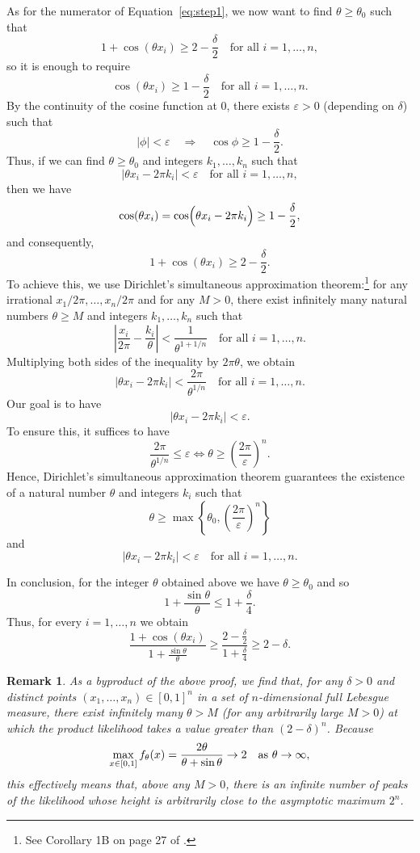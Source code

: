 \documentclass[11pt,twoside]{article}
\newtheorem{remark}{Remark}
\begin{document}
As for the numerator of Equation~\eqref{eq:step1}, we now want to find $\theta\geq \theta_0$ such that
\[
1+\cos(\theta x_i) \ge 2-\frac{\delta}{2} \quad \text{for all } i=1,\dots,n,
\]
so it is enough to require
\[
\cos(\theta x_i) \ge 1-\frac{\delta}{2} \quad \text{for all } i=1,\dots,n.
\]
By the continuity of the cosine function at \(0\), there exists \(\varepsilon > 0\) (depending on \(\delta\)) such that
\[
|\phi| < \varepsilon \quad \Longrightarrow \quad \cos \phi \ge 1-\frac{\delta}{2}.
\]
Thus, if we can find $\theta\geq\theta_0$ and integers $k_1,\dots,k_n$ such that
\[
|\theta x_i - 2\pi k_i| < \varepsilon \quad \text{for all } i=1,\dots,n,
\]
then we have
\[
\cos(\theta x_i) = \cos\Bigl(\theta x_i - 2\pi k_i\Bigr) \ge 1-\frac{\delta}{2},
\]
and consequently,
\[
1+\cos(\theta x_i) \ge 2-\frac{\delta}{2}.
\]
%
To achieve this, we use Dirichlet's simultaneous approximation theorem:\footnote{See Corollary 1B on page 27 of \cite{schmidt2009diophantine}.} for any irrational \(x_1/2\pi, \dots, x_n/2\pi\) and for any \(M > 0\), there exist infinitely many natural numbers \(\theta \ge M\) and integers \(k_1, \dots, k_n\) such that
\[
\left|\frac{x_i}{2\pi} - \frac{k_i}{\theta}\right| < \frac{1}{\theta^{1+1/n}} \quad \text{for all } i = 1,\dots, n.
\]
Multiplying both sides of the inequality by \(2\pi \theta\), we obtain
\[
|\theta x_i - 2\pi k_i| < \frac{2\pi}{\theta^{1/n}} \quad \text{for all } i=1,\dots,n.
\]
Our goal is to have
\[
|\theta x_i - 2\pi k_i| < \varepsilon.
\]
To ensure this, it suffices to have
\[
\frac{2\pi}{\theta^{1/n}} \le \varepsilon \iff \theta \ge \left(\frac{2\pi}{\varepsilon}\right)^n.
\]
%
Hence, Dirichlet's simultaneous approximation theorem guarantees the existence of a natural number \(\theta\) and integers \(k_i\) such that
%
\[
\theta \ge \max\left\{\theta_0, \left(\frac{2\pi}{\varepsilon}\right)^n\right\}
\]
%
and
%
\begin{equation*}
     |\theta x_i - 2\pi k_i| < \varepsilon \quad \text{for all } i=1,\dots,n.
\end{equation*}

In conclusion, for the integer \(\theta\) obtained above we have \(\theta \ge \theta_0\) and so
\[
1+\frac{\sin\theta}{\theta} \le 1+\frac{\delta}{4}.
\]
Thus, for every \(i=1,\dots,n\) we obtain
\[
\frac{1+\cos(\theta x_i)}{1+\frac{\sin\theta}{\theta}} \ge \frac{2-\frac{\delta}{2}}{1+\frac{\delta}{4}}\ge 2-\delta.
\]


\begin{remark}
    As a byproduct of the above proof, we find that, for any $\delta>0$ and distinct points $(x_1, \dots, x_n)\in[0,1]^n$ in a set of $n$-dimensional full Lebesgue measure, there exist infinitely many $\theta >M$ (for any arbitrarily large $M>0$) at which the product likelihood takes a value greater than $(2-\delta)^n$. Because
    \begin{equation*}
        \max_{x\in[0,1]} f_\theta(x) = \frac{2\theta}{\theta + \sin\theta} \to 2 \quad \textnormal{as } \theta\to\infty,
    \end{equation*}
    this effectively means that, above any $M>0$, there is an infinite number of peaks of the likelihood whose height is arbitrarily close to the asymptotic maximum $2^n$.
\end{remark}
\end{document}
